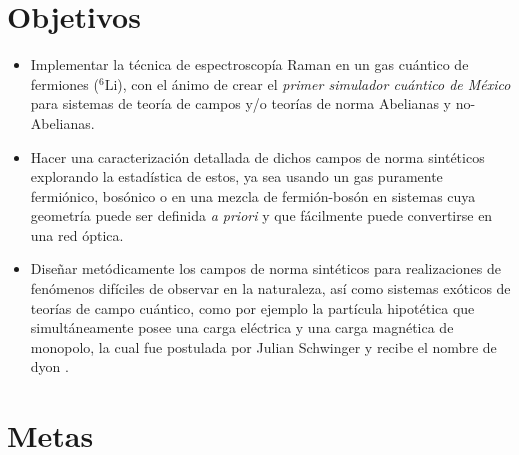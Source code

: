 \documentclass[superscriptaddress,onecolumn,aps,preprint,showpacs,nofootinbib,pra,11pt]{revtex4-2}
\begin{document}
\begin{normalsize}
\section{Objetivos}


\begin{itemize}

\item Implementar la técnica de espectroscopía Raman en un gas cuántico de fermiones ($^{6}\mathrm{Li}$), con el ánimo de crear el\textit{ primer simulador cuántico de México} para sistemas de teoría de campos y/o teorías de norma Abelianas y no-Abelianas. 

\item Hacer una caracterización detallada de dichos campos de norma sintéticos explorando la estadística de estos, ya sea usando un gas puramente fermiónico, bosónico o en una mezcla de fermión-bosón en sistemas cuya geometría puede ser definida \textit{a priori} y que fácilmente puede convertirse en una red óptica.

\item Diseñar metódicamente los campos de norma sintéticos para realizaciones de fenómenos difíciles de observar en la naturaleza, así como sistemas exóticos de teorías de campo cuántico, como por ejemplo la partícula hipotética que simultáneamente posee una carga eléctrica y una carga magnética de monopolo,  la cual fue postulada por Julian Schwinger y recibe el nombre de dyon \cite{Schwinger-science165}.

\end{itemize}

\section{Metas}



\end{normalsize}
\end{document}
